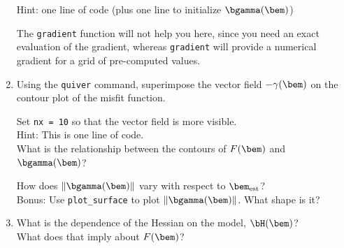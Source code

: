 \documentclass[11pt,titlepage,fleqn]{article}
\begin{document}
\begin{enumerate}
Hint: one line of code (plus one line to initialize $\bgamma(\bem)$)

The \verb+gradient+ function will not help you here, since you need an exact evaluation of the gradient, whereas \verb+gradient+ will provide a numerical gradient for a grid of pre-computed values.

\vertgap

\item Using the \verb+quiver+ command, superimpose the vector field $-\gamma(\bem)$ on the contour plot of the misfit function.

Set \verb+nx = 10+ so that the vector field is more visible. \\
Hint: This is one line of code. \\
What is the relationship between the contours of $F(\bem)$ and $\bgamma(\bem)$?

\vertgap

How does $\|\bgamma(\bem)\|$ vary with respect to $\bem_{\rm est}$? \\
Bonus: Use \verb+plot_surface+ to plot $\|\bgamma(\bem)\|$. What shape is it?

\vertgap

\item What is the dependence of the Hessian on the model, $\bH(\bem)$? \\
What does that imply about $F(\bem)$?


\end{enumerate}

\end{document}
